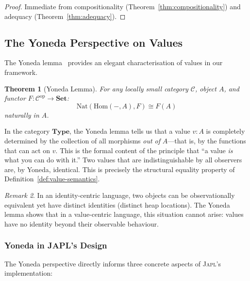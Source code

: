 \documentclass[11pt]{article}
\newtheorem{theorem}{Theorem}[section]
\theoremstyle{definition}
\theoremstyle{remark}
\newtheorem{remark}[theorem]{Remark}
\newcommand{\Set}{\mathbf{Set}}
\newcommand{\Type}{\mathbf{Type}}
\newcommand{\Hom}{\mathrm{Hom}}
\newcommand{\japl}{\textsc{Japl}}
\begin{document}
\begin{proof}
Immediate from compositionality (Theorem~\ref{thm:compositionality})
and adequacy (Theorem~\ref{thm:adequacy}).
\end{proof}

\subsection{The Yoneda Perspective on Values}
\label{sec:formal:yoneda}

The Yoneda lemma~\cite{maclane1998categories} provides an elegant
characterisation of values in our framework.

\begin{theorem}[Yoneda Lemma]
For any locally small category $\mathcal{C}$, object $A$, and functor
$F : \mathcal{C}^{\mathrm{op}} \to \Set$:
\[
  \mathrm{Nat}(\Hom(-, A), F) \cong F(A)
\]
naturally in $A$.
\end{theorem}

In the category $\Type$, the Yoneda lemma tells us that a value
$v : A$ is completely determined by the collection of all morphisms
\emph{out of} $A$---that is, by the functions that can act on $v$.
This is the formal content of the principle that ``a value \emph{is}
what you can do with it.''  Two values that are indistinguishable by
all observers are, by Yoneda, identical.  This is precisely the
structural equality property of Definition~\ref{def:value-semantics}.

\begin{remark}
In an identity-centric language, two objects can be observationally
equivalent yet have distinct identities (distinct heap locations).
The Yoneda lemma shows that in a value-centric language, this
situation cannot arise: values have no identity beyond their
observable behaviour.
\end{remark}

\subsubsection{Yoneda in JAPL's Design}

The Yoneda perspective directly informs three concrete aspects of
\japl{}'s implementation:
\end{document}
